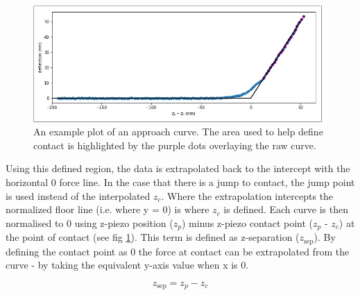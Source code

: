 \begin{figure}[h!]    
        \begin{center}
          \includegraphics[width=110mm]{chapter4/contactRegion.png}
\end{center}
\caption{An example plot of an approach curve. The area used to help define contact is highlighted by the purple dots overlaying the raw curve.} %
\label{fig:contactRegion}                
\end{figure}

Using this defined region, the data is extrapolated back to the intercept with the horizontal 0 force line. In the case that there is a jump to contact, the jump point is used instead of the interpolated $z_c$. Where the extrapolation intercepts the normalized floor line (i.e. where y = 0) is where $z_c$ is defined. Each curve is then normalised to 0 using z-piezo position ($z_p$) minus z-piezo contact point ($z_p$ - $z_c$) at the point of contact (see fig \ref{fig:contactRegion}). This term is defined as z-separation ($z_\text{sep}$). By defining the contact point as 0 the force at contact can be extrapolated from the curve - by taking the equivalent y-axis value when x is 0.

\begin{equation}
z_\text{sep} = z_p - z_c
\end{equation}


